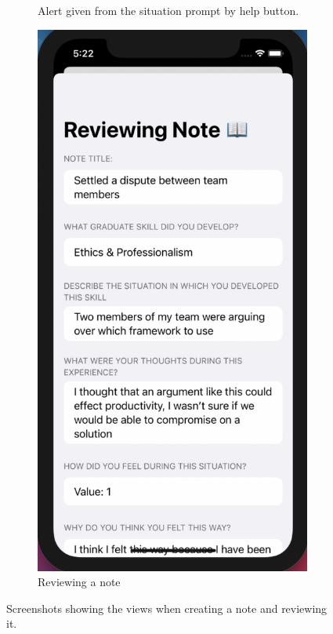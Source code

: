 \documentclass{l4proj}
\begin{document}
\begin{figure}
\begin{subfigure}[b]{0.3\textwidth}
        \caption{Alert given from the situation prompt by help button.}
        \label{fig:HelperButtonAlert}
    \end{subfigure}   
    \begin{subfigure}[b]{0.3\textwidth}
        \includegraphics[scale=0.25]{images/ReviewingNote.pdf}
        \caption{Reviewing a note}
        \label{fig:ReviewingNote}
    \end{subfigure}   
    \caption{Screenshots showing the views when creating a note and reviewing it.}
    \label{fig:NoteCreationReview}
\end{figure}
\end{document}
